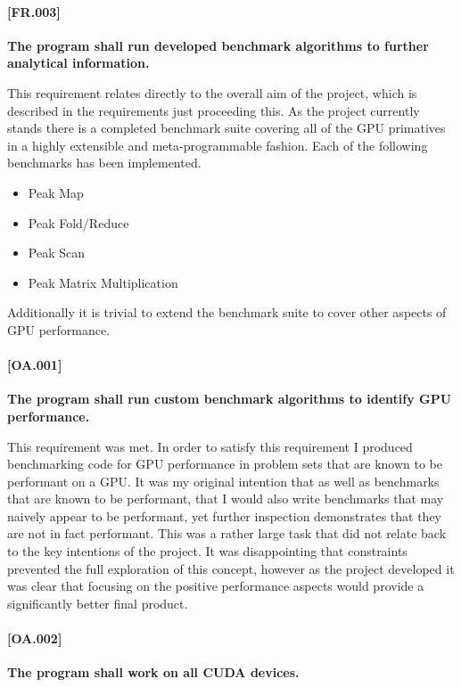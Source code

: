 \paragraph{[FR.003]} \label{[FR.003]}
\textbf{The program shall run developed benchmark algorithms to further analytical information.}

This requirement relates directly to the overall aim of the project, which is described in the
requirements just proceeding this. As the project currently stands there is a completed benchmark
suite covering all of the GPU primatives in a highly extensible and meta-programmable fashion. Each
of the following benchmarks has been implemented.

\begin{itemize}
\item Peak Map
\item Peak Fold/Reduce
\item Peak Scan
\item Peak Matrix Multiplication
\end{itemize}

Additionally it is trivial to extend the benchmark suite to cover other aspects of GPU performance.

\paragraph{[OA.001]} \label{[OA.001]}
\textbf{The program shall run custom benchmark algorithms to identify GPU performance.}

This requirement was met. In order to satisfy this requirement I produced benchmarking code for GPU
performance in problem sets that are known to be performant on a GPU. It was my original intention
that as well as benchmarks that are known to be performant, that I would also write benchmarks that
may naively appear to be performant, yet further inspection demonstrates that they are not in fact
performant. This was a rather large task that did not relate back to the key intentions of the
project. It was disappointing that constraints prevented the full exploration of this concept,
however as the project developed it was clear that focusing on the positive performance aspects
would provide a significantly better final product.

\paragraph{[OA.002]}
\textbf{The program shall work on all CUDA devices.}

